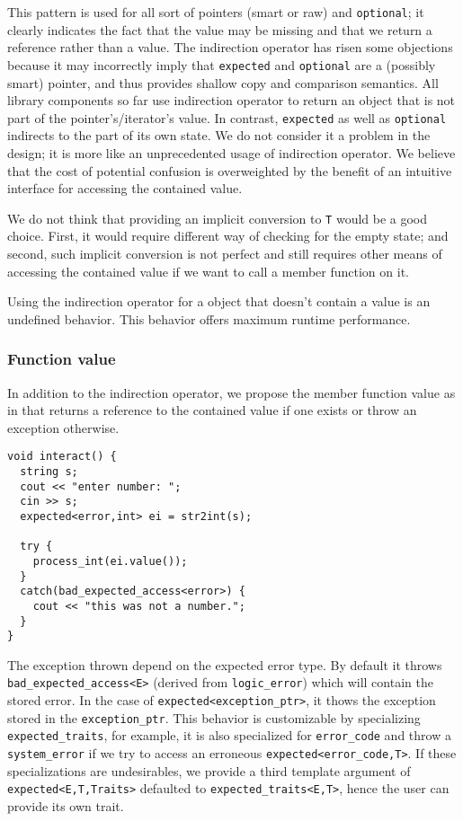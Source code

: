 \documentclass[a4paper,10pt]{article}
\newcommand{\cpp}[1]{\lstinline{#1}}
\begin{document}
This pattern is used for all sort of pointers (smart or raw) and \cpp{optional}; it clearly indicates the fact that the value may be missing and that we return a reference rather than a value. The indirection operator has risen some objections because it may incorrectly imply that \cpp{expected} and \cpp{optional} are a (possibly smart) pointer, and thus provides shallow copy and comparison semantics. All library components so far use indirection operator to return an object that is not part of the pointer's/iterator's value. In contrast, \cpp{expected} as well as \cpp{optional} indirects to the part of its own state. We do not consider it a problem in the design; it is more like an unprecedented usage of indirection operator. We believe that the cost of potential confusion is overweighted by the benefit of an intuitive interface for accessing the contained value.

We do not think that providing an implicit conversion to \cpp{T} would be a good choice. First, it would require different way of checking for the empty state; and second, such implicit conversion is not perfect and still requires other means of accessing the contained value if we want to call a member function on it.

Using the indirection operator for a object that doesn't contain a value is an undefined behavior. This behavior offers maximum runtime performance.

\subsubsection{Function value}

In addition to the indirection operator, we propose the member function value as in \cite{OptionalRev4} that returns a reference to the contained value if one exists or throw an exception otherwise.

\begin{lstlisting}
void interact() {
  string s;
  cout << "enter number: ";
  cin >> s;
  expected<error,int> ei = str2int(s);
  
  try {
    process_int(ei.value());
  }
  catch(bad_expected_access<error>) {
    cout << "this was not a number.";
  }
}
\end{lstlisting}

The exception thrown depend on the expected error type. By default it throws \cpp{bad_expected_access<E>} (derived from \cpp{logic_error}) which will contain the stored error. In the case of \cpp{expected<exception_ptr>}, it thows the exception stored in the \cpp{exception_ptr}. This behavior is customizable by specializing \cpp{expected_traits}, for example, it is also specialized for \cpp{error_code} and throw a \cpp{system_error} if we try to access an erroneous \cpp{expected<error_code,T>}. If these specializations are undesirables, we provide a third template argument of \cpp{expected<E,T,Traits>} defaulted to \cpp{expected_traits<E,T>}, hence the user can provide its own trait.
\end{document}
